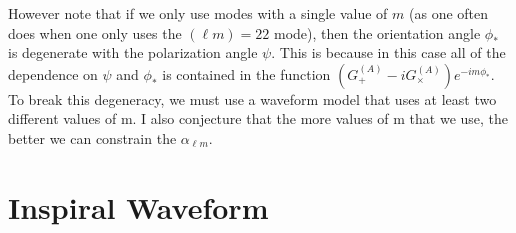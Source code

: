 \documentclass[aps,prd,amsmath,showpacs,amssymb,superscriptaddress,nofootinbib,longbibliography,eqsecnum,preprintnumbers]{revtex4-1}
\newcommand{\Ys}{{}_{-2}Y_{\ell m}}
\begin{document}
However note that if we only use modes with a single value of $m$ (as one often does when one only uses the $(\ell m)=22$ mode), then the orientation angle $\phi_*$ is degenerate with the polarization angle $\psi$. This is because in this case all of the dependence on $\psi$ and $\phi_*$ is contained in the function $(G_+^{(A)}-iG_\times^{(A)})e^{-im\phi_*}$. To break this degeneracy, we must use a waveform model that uses at least two different values of m. I also conjecture that the more values of m that we use, the better we can constrain the $\alpha_{\ell m}$.



\section{Inspiral Waveform}
\end{document}
